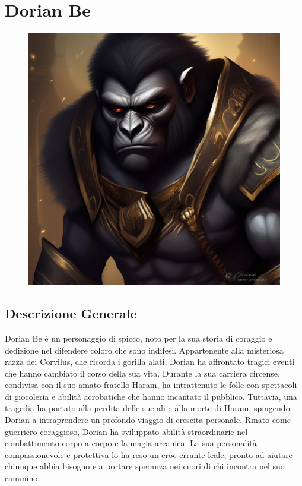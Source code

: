 \section{Dorian Be}\label{dorian-be}


\begin{figure}
\centering
\includegraphics{create-an-image-of-dorian-be-a-heroic-character-from-a-fantasy-world-dorian-is-a-corvilus-a-race---2.png}
\end{figure}

\subsection{Descrizione Generale}\label{descrizione-generale}



Dorian Be è un personaggio di spicco, noto per la sua storia di coraggio
e dedizione nel difendere coloro che sono indifesi. Appartenente alla
misteriosa razza dei Corvilus, che ricorda i gorilla alati, Dorian ha
affrontato tragici eventi che hanno cambiato il corso della sua vita.
Durante la sua carriera circense, condivisa con il suo amato fratello
Haram, ha intrattenuto le folle con spettacoli di giocoleria e abilità
acrobatiche che hanno incantato il pubblico. Tuttavia, una tragedia ha
portato alla perdita delle sue ali e alla morte di Haram, spingendo
Dorian a intraprendere un profondo viaggio di crescita personale. Rinato
come guerriero coraggioso, Dorian ha sviluppato abilità straordinarie
nel combattimento corpo a corpo e la magia arcanica. La sua personalità
compassionevole e protettiva lo ha reso un eroe errante leale, pronto ad
aiutare chiunque abbia bisogno e a portare speranza nei cuori di chi
incontra nel suo cammino.

